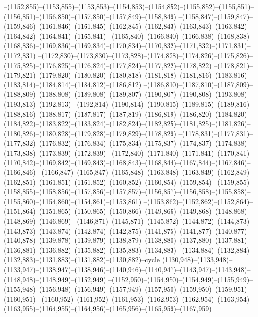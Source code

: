 --(1152,855)--(1153,855)--(1153,853)--(1154,853)--(1154,852)--(1155,852)--(1155,851)--(1156,851)--(1156,850)--(1157,850)--(1157,849)--(1158,849)
--(1158,847)--(1159,847)--(1159,846)--(1161,846)--(1161,845)--(1162,845)--(1162,843)--(1163,843)--(1163,842)--(1164,842)--(1164,841)--(1165,841)
--(1165,840)--(1166,840)--(1166,838)--(1168,838)--(1168,836)--(1169,836)--(1169,834)--(1170,834)--(1170,832)--(1171,832)--(1171,831)--(1172,831)
--(1172,830)--(1173,830)--(1173,828)--(1174,828)--(1174,826)--(1175,826)--(1175,825)--(1176,825)--(1176,824)--(1177,824)--(1177,822)--(1178,822)
--(1178,821)--(1179,821)--(1179,820)--(1180,820)--(1180,818)--(1181,818)--(1181,816)--(1183,816)--(1183,814)--(1184,814)--(1184,812)--(1186,812)
--(1186,810)--(1187,810)--(1187,809)--(1188,809)--(1188,808)--(1189,808)--(1189,807)--(1190,807)--(1190,808)--(1193,808)--(1193,813)--(1192,813)
--(1192,814)--(1190,814)--(1190,815)--(1189,815)--(1189,816)--(1188,816)--(1188,817)--(1187,817)--(1187,819)--(1186,819)--(1186,820)--(1184,820)
--(1184,822)--(1183,822)--(1183,824)--(1182,824)--(1182,825)--(1181,825)--(1181,826)--(1180,826)--(1180,828)--(1179,828)--(1179,829)--(1178,829)
--(1178,831)--(1177,831)--(1177,832)--(1176,832)--(1176,834)--(1175,834)--(1175,837)--(1174,837)--(1174,838)--(1173,838)--(1173,839)--(1172,839)
--(1172,840)--(1171,840)--(1171,841)--(1170,841)--(1170,842)--(1169,842)--(1169,843)--(1168,843)--(1168,844)--(1167,844)--(1167,846)--(1166,846)
--(1166,847)--(1165,847)--(1165,848)--(1163,848)--(1163,849)--(1162,849)--(1162,851)--(1161,851)--(1161,852)--(1160,852)--(1160,854)--(1159,854)
--(1159,855)--(1158,855)--(1158,856)--(1157,856)--(1157,857)--(1156,857)--(1156,858)--(1155,858)--(1155,860)--(1154,860)--(1154,861)--(1153,861)
--(1153,862)--(1152,862)--(1152,864)--(1151,864)--(1151,865)--(1150,865)--(1150,866)--(1149,866)--(1149,868)--(1148,868)--(1148,869)--(1146,869)
--(1146,871)--(1145,871)--(1145,872)--(1144,872)--(1144,873)--(1143,873)--(1143,874)--(1142,874)--(1142,875)--(1141,875)--(1141,877)--(1140,877)
--(1140,878)--(1139,878)--(1139,879)--(1138,879)--(1138,880)--(1137,880)--(1137,881)--(1136,881)--(1136,882)--(1135,882)--(1135,883)--(1134,883)
--(1134,884)--(1132,884)--(1132,883)--(1131,883)--(1131,882)--(1130,882)--cycle
(1130,948)--(1133,948)--(1133,947)--(1138,947)--(1138,946)--(1140,946)--(1140,947)--(1143,947)--(1143,948)--(1148,948)--(1148,949)--(1152,949)
--(1152,950)--(1154,950)--(1154,949)--(1155,949)--(1155,948)--(1156,948)--(1156,949)--(1157,949)--(1157,950)--(1159,950)--(1159,951)--(1160,951)
--(1160,952)--(1161,952)--(1161,953)--(1162,953)--(1162,954)--(1163,954)--(1163,955)--(1164,955)--(1164,956)--(1165,956)--(1165,959)--(1167,959)
